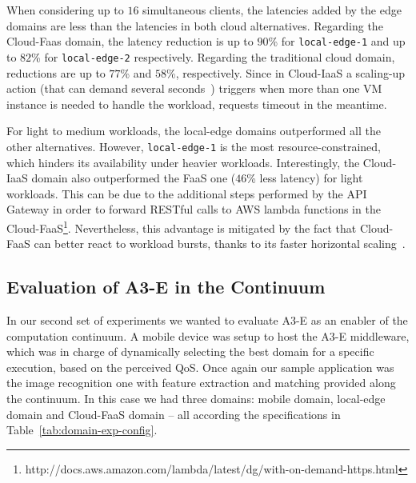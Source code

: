  When considering up to $16$ simultaneous clients, the latencies added by the edge domains are less than the latencies in both cloud alternatives. Regarding the Cloud-Faas domain, the latency reduction is up to $90$\% for \texttt{local-edge-1} and up to $82$\% for \texttt{local-edge-2} respectively. Regarding the traditional cloud domain, reductions are up to $77$\% and $58$\%, respectively. Since in Cloud-IaaS a scaling-up action (that can demand several seconds~\cite{Quatrocchi2016discrete}) triggers when more than one VM instance is needed to handle the workload, requests timeout in the meantime. 
 
 For light to medium workloads, the local-edge domains outperformed all the other alternatives. However, \texttt{local-edge-1} is the most resource-constrained, which hinders its availability under heavier workloads. Interestingly, the Cloud-IaaS domain also outperformed the FaaS one ($46$\% less latency) for light workloads. This can be due to the additional steps performed by the API Gateway in order to forward RESTful calls to AWS lambda functions in the Cloud-FaaS\footnote{http://docs.aws.amazon.com/lambda/latest/dg/with-on-demand-https.html}. Nevertheless, this advantage is mitigated by the fact that Cloud-FaaS can better react to workload bursts, thanks to its faster horizontal scaling~\cite{Villamizar2017lambda,Hendrickson:2016}.



\subsection{Evaluation of A3-E in the Continuum} 

In our second set of experiments we wanted to evaluate A3-E as an enabler of the computation continuum. A mobile device was setup to host the A3-E middleware, which was in charge of dynamically selecting the best domain for a specific execution, based on the perceived QoS. 
Once again our sample application was the image recognition one with feature extraction and matching provided along the continuum. In this case we had three domains: mobile domain, local-edge domain and Cloud-FaaS domain -- all according the specifications in Table~\ref{tab:domain-exp-config}.

